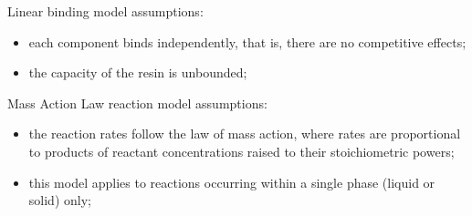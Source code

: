 \documentclass{article}
\begin{document}
Linear binding model assumptions:
\begin{itemize}
    \item each component binds independently, that is, there are no competitive effects;
    \item the capacity of the resin is unbounded;
\end{itemize}

Mass Action Law reaction model assumptions:
\begin{itemize}
    \item the reaction rates follow the law of mass action, where rates are proportional to products of reactant concentrations raised to their stoichiometric powers;
    \item this model applies to reactions occurring within a single phase (liquid or solid) only;
\end{itemize}
\end{document}
